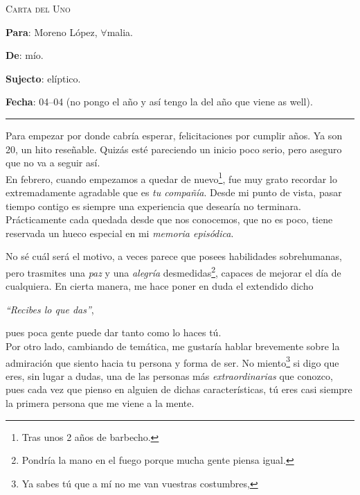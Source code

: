 \documentclass[11pt]{article}
\begin{document}
\begin{center}
    \Large{\textsc{Carta del Uno}}
\end{center}

\vspace{2px}

\noindent\textbf{Para}: Moreno López, $\forall$malia.

\vspace{2px}

\noindent\textbf{De}: mío.

\vspace{2px}

\noindent\textbf{Sujecto}: elíptico.

\vspace{2px}

\noindent\textbf{Fecha}: 04--04 (no pongo el año y así tengo la del año que viene as well).

\vspace{6px}

\hrule

\vspace{6px}

\noindent Para empezar por donde cabría esperar, felicitaciones por cumplir años. Ya son 20, un hito reseñable. Quizás esté pareciendo un
inicio poco serio, pero aseguro que no va a seguir así. \\

\noindent En febrero, cuando empezamos a quedar de nuevo\footnote{Tras unos 2 años de barbecho.}, fue muy grato recordar lo extremadamente agradable que es \textit{tu compañía}. Desde mi punto de vista,
pasar tiempo contigo es siempre una experiencia que desearía no terminara. Prácticamente cada quedada desde que nos conocemos, que no es poco, tiene reservada un hueco especial en mi \textit{memoria episódica}. 

No sé cuál será el motivo, a veces parece que posees habilidades sobrehumanas, pero trasmites una \textit{paz} y una \textit{alegría} 
desmedidas\footnote{Pondría la mano en el fuego porque mucha gente piensa igual.}, capaces de mejorar el día de cualquiera. En cierta manera, me hace poner en duda el extendido dicho

\begin{center}
    \textit{``Recibes lo que das''},
\end{center}

\noindent pues poca gente puede dar tanto como lo haces tú. \\

\noindent Por otro lado, cambiando de temática, me gustaría hablar brevemente sobre la admiración que siento hacia tu persona y forma de ser. No miento\footnote{Ya sabes tú que a mí no me van vuestras costumbres,} si digo
que eres, sin lugar a dudas, una de las personas más \textit{extraordinarias} que conozco, pues cada vez que pienso en alguien de dichas características, tú eres casi siempre la primera persona que me viene a la mente. %
\end{document}
